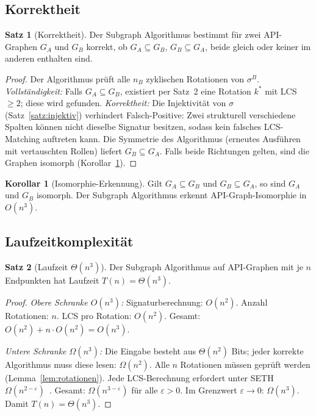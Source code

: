 ﻿\documentclass[a4paper,12pt]{article}
\theoremstyle{definition}
\newtheorem{satz}{Satz}
\newtheorem{korollar}{Korollar}
\begin{document}
\subsection{Korrektheit}

\begin{satz}[Korrektheit]
  \label{satz:korrektheit}
  Der Subgraph Algorithmus bestimmt für zwei API-Graphen $G_A$ und $G_B$
  korrekt, ob $G_A \subseteq G_B$, $G_B \subseteq G_A$, beide gleich oder
  keiner im anderen enthalten sind.
\end{satz}

\begin{proof}
  Der Algorithmus prüft alle $n_B$ zyklischen Rotationen von $\sigma^B$.
  \textit{Vollständigkeit:} Falls $G_A \subseteq G_B$, existiert per
  Satz~2 eine Rotation $k^*$ mit LCS $\geq 2$; diese wird gefunden.
  \textit{Korrektheit:} Die Injektivität von $\sigma$ (Satz~\ref{satz:injektiv})
  verhindert Falsch-Positive: Zwei strukturell verschiedene Spalten können
  nicht dieselbe Signatur besitzen, sodass kein falsches LCS-Matching auftreten
  kann. Die Symmetrie des Algorithmus (erneutes Ausführen mit vertauschten Rollen)
  liefert $G_B \subseteq G_A$. Falls beide Richtungen gelten, sind die Graphen
  isomorph (Korollar~\ref{kor:iso}).
\end{proof}

\begin{korollar}[Isomorphie-Erkennung]
  \label{kor:iso}
  Gilt $G_A \subseteq G_B$ und $G_B \subseteq G_A$, so sind $G_A$ und $G_B$
  isomorph. Der Subgraph Algorithmus erkennt API-Graph-Isomorphie in $O(n^3)$.
\end{korollar}

\subsection{Laufzeitkomplexität}

\begin{satz}[Laufzeit $\Theta(n^3)$]
  Der Subgraph Algorithmus auf API-Graphen mit je $n$ Endpunkten hat
  Laufzeit $T(n) = \Theta(n^3)$.
\end{satz}

\begin{proof}
  \textit{Obere Schranke $O(n^3)$:} Signaturberechnung: $O(n^2)$.
  Anzahl Rotationen: $n$. LCS pro Rotation: $O(n^2)$. Gesamt:
  $O(n^2) + n \cdot O(n^2) = O(n^3)$.

  \textit{Untere Schranke $\Omega(n^3)$:} Die Eingabe besteht aus $\Theta(n^2)$
  Bits; jeder korrekte Algorithmus muss diese lesen: $\Omega(n^2)$.
  Alle $n$ Rotationen müssen geprüft werden (Lemma~\ref{lem:rotationen}).
  Jede LCS-Berechnung erfordert unter SETH $\Omega(n^{2-\varepsilon})$~\cite{abboud2015}.
  Gesamt: $\Omega(n^{3-\varepsilon})$ für alle $\varepsilon > 0$. Im Grenzwert
  $\varepsilon \to 0$: $\Omega(n^3)$. Damit $T(n) = \Theta(n^3)$.
\end{proof}
\end{document}
